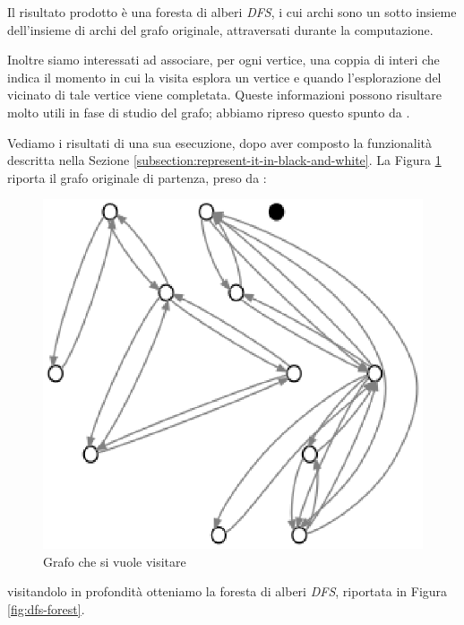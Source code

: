 Il risultato prodotto \`e una foresta di alberi \emph{DFS}, i cui
archi sono un sotto insieme dell'insieme di archi del grafo originale,
attraversati durante la computazione.

Inoltre siamo interessati ad associare, per ogni vertice, una coppia
di interi che indica il momento in cui la visita esplora un vertice e
quando l'esplorazione del vicinato di tale vertice viene
completata. Queste informazioni possono risultare molto utili in fase
di studio del grafo; abbiamo ripreso questo spunto da
\cite{Algorithms}.

Vediamo i risultati di una sua esecuzione, dopo aver composto la
funzionalit\`a descritta nella Sezione
\ref{subsection:represent-it-in-black-and-white}. La Figura
\ref{fig:before-applying-dfs-search} riporta il grafo originale di
partenza, preso da \cite{Algorithms}:
\begin{figure}
  \centering
  \includegraphics{images/OnePipingLevelUnitTest_Printer_DFS_PrinterPipe_Papadimitriou-phase-PrinterPipeFilter-level-0.eps}
  \caption{Grafo che si vuole visitare}
  \label{fig:before-applying-dfs-search}
\end{figure}
visitandolo in profondit\`a otteniamo la foresta di alberi \emph{DFS},
riportata in Figura \ref{fig:dfs-forest}.
